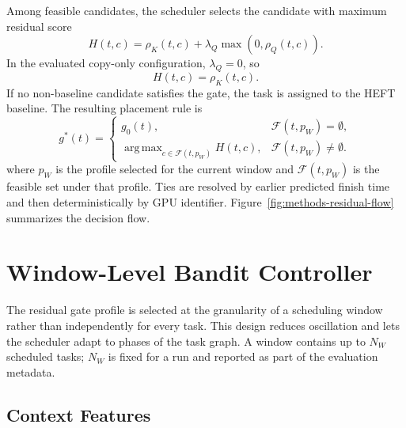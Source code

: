 Among feasible candidates, the scheduler selects the candidate with maximum residual score
\begin{equation}
H(t,c)
=
\rho_K(t,c)+\lambda_Q\max(0,\rho_Q(t,c)).
\end{equation}
In the evaluated copy-only configuration, $\lambda_Q=0$, so
\begin{equation}
H(t,c)=\rho_K(t,c).
\end{equation}
If no non-baseline candidate satisfies the gate, the task is assigned to the HEFT baseline. The resulting placement rule is
\begin{equation}
g^{*}(t)
=
\left\{
\begin{array}{ll}
g_0(t), & \mathcal{F}(t,p_W)=\emptyset,\\[4pt]
\displaystyle
\mathop{\mathrm{arg\,max}}_{c\in\mathcal{F}(t,p_W)}H(t,c), & \mathcal{F}(t,p_W)\neq\emptyset.
\end{array}
\right.
\end{equation}
where $p_W$ is the profile selected for the current window and $\mathcal{F}(t,p_W)$ is the feasible set under that profile. Ties are resolved by earlier predicted finish time and then deterministically by GPU identifier. Figure~\ref{fig:methods-residual-flow} summarizes the decision flow.

\figMethodsResidualFlow

\section{Window-Level Bandit Controller}
\label{sec:methods-bandit-controller}

The residual gate profile is selected at the granularity of a scheduling window rather than independently for every task. This design reduces oscillation and lets the scheduler adapt to phases of the task graph. A window contains up to $N_W$ scheduled tasks; $N_W$ is fixed for a run and reported as part of the evaluation metadata.

\subsection{Context Features}
\label{subsec:methods-context-features}

